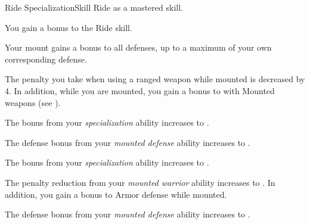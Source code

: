     \begin{feat}{Ride Specialization}{Skill}
        \featpre Ride as a mastered skill.

         You gain a  bonus to the Ride skill.

         Your mount gains a  bonus to all defenses, up to a maximum of your own corresponding defense.

         The penalty you take when using a ranged weapon while mounted is decreased by 4.
        In addition, while you are mounted, you gain a  bonus to  with Mounted weapons (see ).

         The bonus from your \textit{specialization} ability increases to .

         The defense bonus from your \textit{mounted defense} ability increases to .

         The bonus from your \textit{specialization} ability increases to .

         The penalty reduction from your \textit{mounted warrior} ability increases to .
        In addition, you gain a  bonus to Armor defense while mounted.

         The defense bonus from your \textit{mounted defense} ability increases to .
    \end{feat}

